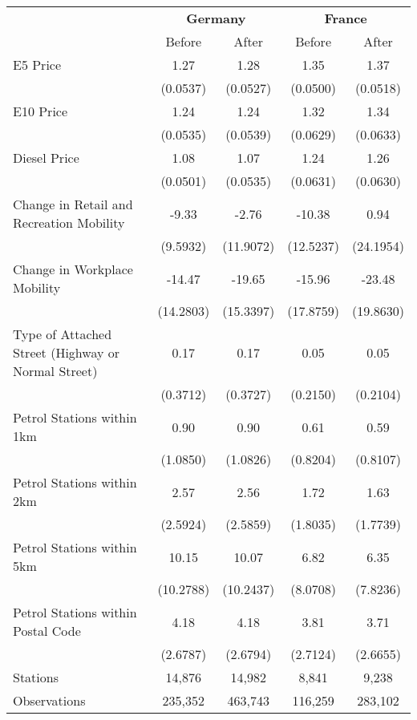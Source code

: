 \begin{tabular}{l*{4}{c}}
\toprule
                    &\multicolumn{2}{c}{\textbf{Germany}}&\multicolumn{2}{c}{\textbf{France}}\\\cmidrule(lr){2-3}\cmidrule(lr){4-5}
                    &\multicolumn{1}{c}{Before}&\multicolumn{1}{c}{After}&\multicolumn{1}{c}{Before}&\multicolumn{1}{c}{After}\\
\midrule
E5 Price            &        1.27&        1.28&        1.35&        1.37\\
                    &    (0.0537)&    (0.0527)&    (0.0500)&    (0.0518)\\
E10 Price           &        1.24&        1.24&        1.32&        1.34\\
                    &    (0.0535)&    (0.0539)&    (0.0629)&    (0.0633)\\
Diesel Price        &        1.08&        1.07&        1.24&        1.26\\
                    &    (0.0501)&    (0.0535)&    (0.0631)&    (0.0630)\\
Change in Retail and Recreation Mobility&       -9.33&       -2.76&      -10.38&        0.94\\
                    &    (9.5932)&   (11.9072)&   (12.5237)&   (24.1954)\\
Change in Workplace Mobility&      -14.47&      -19.65&      -15.96&      -23.48\\
                    &   (14.2803)&   (15.3397)&   (17.8759)&   (19.8630)\\
Type of Attached Street (Highway or Normal Street)&        0.17&        0.17&        0.05&        0.05\\
                    &    (0.3712)&    (0.3727)&    (0.2150)&    (0.2104)\\
Petrol Stations within 1km&        0.90&        0.90&        0.61&        0.59\\
                    &    (1.0850)&    (1.0826)&    (0.8204)&    (0.8107)\\
Petrol Stations within 2km&        2.57&        2.56&        1.72&        1.63\\
                    &    (2.5924)&    (2.5859)&    (1.8035)&    (1.7739)\\
Petrol Stations within 5km&       10.15&       10.07&        6.82&        6.35\\
                    &   (10.2788)&   (10.2437)&    (8.0708)&    (7.8236)\\
Petrol Stations within Postal Code&        4.18&        4.18&        3.81&        3.71\\
                    &    (2.6787)&    (2.6794)&    (2.7124)&    (2.6655)\\
\midrule
Stations            &      14,876&      14,982&       8,841&       9,238\\
Observations        &     235,352&     463,743&     116,259&     283,102\\
\bottomrule
\end{tabular}
